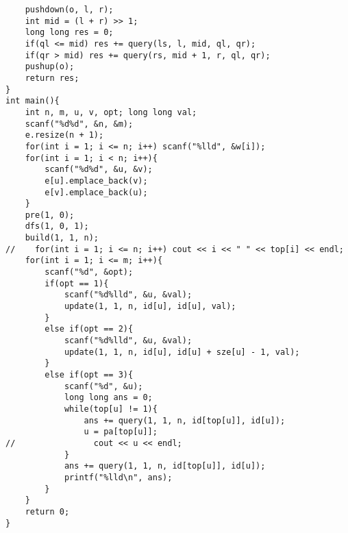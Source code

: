\begin{lstlisting}
    pushdown(o, l, r);
    int mid = (l + r) >> 1;
    long long res = 0;
    if(ql <= mid) res += query(ls, l, mid, ql, qr);
    if(qr > mid) res += query(rs, mid + 1, r, ql, qr);
    pushup(o);
    return res;
}
int main(){
    int n, m, u, v, opt; long long val;
    scanf("%d%d", &n, &m);
    e.resize(n + 1);
    for(int i = 1; i <= n; i++) scanf("%lld", &w[i]);
    for(int i = 1; i < n; i++){
        scanf("%d%d", &u, &v);
        e[u].emplace_back(v);
        e[v].emplace_back(u);
    }
    pre(1, 0);
    dfs(1, 0, 1);
    build(1, 1, n);
//    for(int i = 1; i <= n; i++) cout << i << " " << top[i] << endl;
    for(int i = 1; i <= m; i++){
        scanf("%d", &opt);
        if(opt == 1){
            scanf("%d%lld", &u, &val);
            update(1, 1, n, id[u], id[u], val);
        }
        else if(opt == 2){
            scanf("%d%lld", &u, &val);
            update(1, 1, n, id[u], id[u] + sze[u] - 1, val);
        }
        else if(opt == 3){
            scanf("%d", &u);
            long long ans = 0;
            while(top[u] != 1){
                ans += query(1, 1, n, id[top[u]], id[u]);
                u = pa[top[u]];
//                cout << u << endl;
            }
            ans += query(1, 1, n, id[top[u]], id[u]);
            printf("%lld\n", ans);
        }
    }
    return 0;
}
\end{lstlisting}